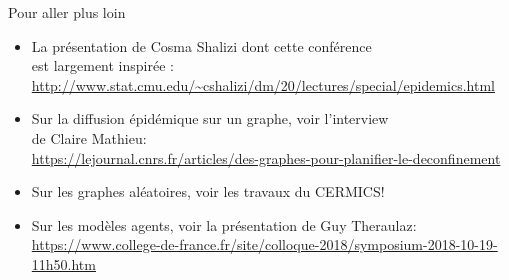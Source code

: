 \documentclass[10pt]{beamer}
\begin{document}
\begin{frame}{Pour aller plus loin}

  {\small
  \begin{itemize}
    \item La présentation de Cosma Shalizi dont cette conférence \\
      est largement inspirée :  \\
      \url{http://www.stat.cmu.edu/~cshalizi/dm/20/lectures/special/epidemics.html}
    \item Sur la diffusion épidémique sur un graphe, voir l'interview \\
      de Claire Mathieu:  \\
      \url{https://lejournal.cnrs.fr/articles/des-graphes-pour-planifier-le-deconfinement}
    \item Sur les graphes aléatoires, voir les travaux du CERMICS!
    \item Sur les modèles agents, voir la présentation de Guy Theraulaz: \\
      \url{https://www.college-de-france.fr/site/colloque-2018/symposium-2018-10-19-11h50.htm}
  \end{itemize}
  }

\end{frame}



\end{document}
